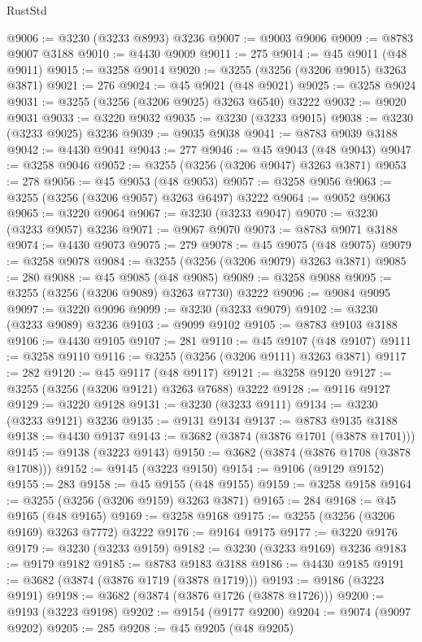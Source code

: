 \begin{lexlean}{RustStd}
\begin{coremodule}
@9006 := @3230 (@3233 @8993) @3236
@9007 := @9003 @9006
@9009 := @8783 @9007 @3188
@9010 := @4430 @9009
@9011 := 275
@9014 := @45 @9011 (@48 @9011)
@9015 := @3258 @9014
@9020 := @3255 (@3256 (@3206 @9015) @3263 @3871)
@9021 := 276
@9024 := @45 @9021 (@48 @9021)
@9025 := @3258 @9024
@9031 := @3255 (@3256 (@3206 @9025) @3263 @6540) @3222
@9032 := @9020 @9031
@9033 := @3220 @9032
@9035 := @3230 (@3233 @9015)
@9038 := @3230 (@3233 @9025) @3236
@9039 := @9035 @9038
@9041 := @8783 @9039 @3188
@9042 := @4430 @9041
@9043 := 277
@9046 := @45 @9043 (@48 @9043)
@9047 := @3258 @9046
@9052 := @3255 (@3256 (@3206 @9047) @3263 @3871)
@9053 := 278
@9056 := @45 @9053 (@48 @9053)
@9057 := @3258 @9056
@9063 := @3255 (@3256 (@3206 @9057) @3263 @6497) @3222
@9064 := @9052 @9063
@9065 := @3220 @9064
@9067 := @3230 (@3233 @9047)
@9070 := @3230 (@3233 @9057) @3236
@9071 := @9067 @9070
@9073 := @8783 @9071 @3188
@9074 := @4430 @9073
@9075 := 279
@9078 := @45 @9075 (@48 @9075)
@9079 := @3258 @9078
@9084 := @3255 (@3256 (@3206 @9079) @3263 @3871)
@9085 := 280
@9088 := @45 @9085 (@48 @9085)
@9089 := @3258 @9088
@9095 := @3255 (@3256 (@3206 @9089) @3263 @7730) @3222
@9096 := @9084 @9095
@9097 := @3220 @9096
@9099 := @3230 (@3233 @9079)
@9102 := @3230 (@3233 @9089) @3236
@9103 := @9099 @9102
@9105 := @8783 @9103 @3188
@9106 := @4430 @9105
@9107 := 281
@9110 := @45 @9107 (@48 @9107)
@9111 := @3258 @9110
@9116 := @3255 (@3256 (@3206 @9111) @3263 @3871)
@9117 := 282
@9120 := @45 @9117 (@48 @9117)
@9121 := @3258 @9120
@9127 := @3255 (@3256 (@3206 @9121) @3263 @7688) @3222
@9128 := @9116 @9127
@9129 := @3220 @9128
@9131 := @3230 (@3233 @9111)
@9134 := @3230 (@3233 @9121) @3236
@9135 := @9131 @9134
@9137 := @8783 @9135 @3188
@9138 := @4430 @9137
@9143 := @3682 (@3874 (@3876 @1701 (@3878 @1701)))
@9145 := @9138 (@3223 @9143)
@9150 := @3682 (@3874 (@3876 @1708 (@3878 @1708)))
@9152 := @9145 (@3223 @9150)
@9154 := @9106 (@9129 @9152)
@9155 := 283
@9158 := @45 @9155 (@48 @9155)
@9159 := @3258 @9158
@9164 := @3255 (@3256 (@3206 @9159) @3263 @3871)
@9165 := 284
@9168 := @45 @9165 (@48 @9165)
@9169 := @3258 @9168
@9175 := @3255 (@3256 (@3206 @9169) @3263 @7772) @3222
@9176 := @9164 @9175
@9177 := @3220 @9176
@9179 := @3230 (@3233 @9159)
@9182 := @3230 (@3233 @9169) @3236
@9183 := @9179 @9182
@9185 := @8783 @9183 @3188
@9186 := @4430 @9185
@9191 := @3682 (@3874 (@3876 @1719 (@3878 @1719)))
@9193 := @9186 (@3223 @9191)
@9198 := @3682 (@3874 (@3876 @1726 (@3878 @1726)))
@9200 := @9193 (@3223 @9198)
@9202 := @9154 (@9177 @9200)
@9204 := @9074 (@9097 @9202)
@9205 := 285
@9208 := @45 @9205 (@48 @9205)

\end{coremodule}
\end{lexlean}
